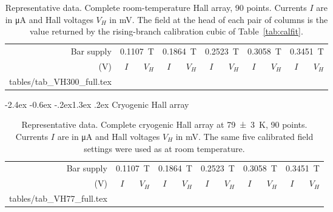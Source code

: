 \documentclass[11pt,a4paper]{article}
\makeatletter
\newcommand{\datarows}[1]{\@@input #1 }
\renewcommand\section{\@startsection{section}{1}{\z@}%
  {-2.4ex \@plus -0.6ex \@minus -.2ex}{1.3ex \@plus .2ex}%
  {\normalfont\large\bfseries}}
\makeatother
\begin{document}
\begin{table}[H]
\centering
\caption{Representative data. Complete room-temperature Hall array, \num{90} points. Currents
$I$ are in \unit{\micro\ampere} and Hall voltages $V_H$ in \unit{\milli\volt}. The field at
the head of each pair of columns is the value returned by the rising-branch calibration cubic
of Table~\ref{tab:calfit}.}
\label{tab:appvh300}
\scriptsize
\setlength{\tabcolsep}{3.5pt}
\begin{tabular}{rrrrrrrrrrr}
\toprule
Bar supply & \multicolumn{2}{c}{\qty{0.1107}{\tesla}} & \multicolumn{2}{c}{\qty{0.1864}{\tesla}}
 & \multicolumn{2}{c}{\qty{0.2523}{\tesla}} & \multicolumn{2}{c}{\qty{0.3058}{\tesla}}
 & \multicolumn{2}{c}{\qty{0.3451}{\tesla}} \\
\cmidrule(lr){2-3}\cmidrule(lr){4-5}\cmidrule(lr){6-7}\cmidrule(lr){8-9}\cmidrule(lr){10-11}
(\unit{\volt}) & $I$ & $V_H$ & $I$ & $V_H$ & $I$ & $V_H$ & $I$ & $V_H$ & $I$ & $V_H$ \\
\midrule
\datarows{tables/tab_VH300_full.tex}
\bottomrule
\end{tabular}
\end{table}

\section{Cryogenic Hall array}
\label{app:vh77}

\begin{table}[H]
\centering
\caption{Representative data. Complete cryogenic Hall array at \qty{79(3)}{\kelvin},
\num{90} points. Currents $I$ are in \unit{\micro\ampere} and Hall voltages $V_H$ in
\unit{\milli\volt}. The same five calibrated field settings were used as at room temperature.}
\label{tab:appvh77}
\scriptsize
\setlength{\tabcolsep}{3.5pt}
\begin{tabular}{rrrrrrrrrrr}
\toprule
Bar supply & \multicolumn{2}{c}{\qty{0.1107}{\tesla}} & \multicolumn{2}{c}{\qty{0.1864}{\tesla}}
 & \multicolumn{2}{c}{\qty{0.2523}{\tesla}} & \multicolumn{2}{c}{\qty{0.3058}{\tesla}}
 & \multicolumn{2}{c}{\qty{0.3451}{\tesla}} \\
\cmidrule(lr){2-3}\cmidrule(lr){4-5}\cmidrule(lr){6-7}\cmidrule(lr){8-9}\cmidrule(lr){10-11}
(\unit{\volt}) & $I$ & $V_H$ & $I$ & $V_H$ & $I$ & $V_H$ & $I$ & $V_H$ & $I$ & $V_H$ \\
\midrule
\datarows{tables/tab_VH77_full.tex}
\bottomrule
\end{tabular}
\end{table}
\end{document}
